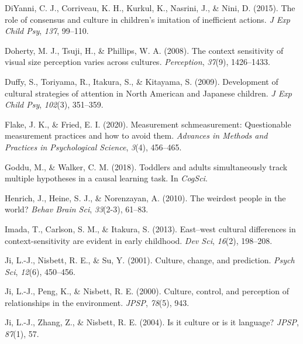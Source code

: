 \documentclass[
  man]{apa6}
\newlength{\cslhangindent}
\newlength{\cslentryspacingunit} %
\newenvironment{CSLReferences}[2] %
 {%
  \setlength{\parindent}{0pt}
  \ifodd #1
  \let\oldpar\par
  \def\par{\hangindent=\cslhangindent\oldpar}
  \fi
  \setlength{\parskip}{#2\cslentryspacingunit}
 }%
 {}
\begin{document}
\begin{CSLReferences}{1}{0}
\leavevmode{}%
DiYanni, C. J., Corriveau, K. H., Kurkul, K., Nasrini, J., \& Nini, D. (2015). The role of consensus and culture in children's imitation of inefficient actions. \emph{J Exp Child Psy}, \emph{137}, 99--110.

\leavevmode{}%
Doherty, M. J., Tsuji, H., \& Phillips, W. A. (2008). The context sensitivity of visual size perception varies across cultures. \emph{Perception}, \emph{37}(9), 1426--1433.

\leavevmode{}%
Duffy, S., Toriyama, R., Itakura, S., \& Kitayama, S. (2009). Development of cultural strategies of attention in {N}orth {A}merican and {J}apanese children. \emph{J Exp Child Psy}, \emph{102}(3), 351--359.

\leavevmode{}%
Flake, J. K., \& Fried, E. I. (2020). Measurement schmeasurement: Questionable measurement practices and how to avoid them. \emph{Advances in Methods and Practices in Psychological Science}, \emph{3}(4), 456--465.

\leavevmode{}%
Goddu, M., \& Walker, C. M. (2018). Toddlers and adults simultaneously track multiple hypotheses in a causal learning task. In \emph{CogSci}.

\leavevmode{}%
Henrich, J., Heine, S. J., \& Norenzayan, A. (2010). The weirdest people in the world? \emph{Behav Brain Sci}, \emph{33}(2-3), 61--83.

\leavevmode{}%
Imada, T., Carlson, S. M., \& Itakura, S. (2013). East--west cultural differences in context-sensitivity are evident in early childhood. \emph{Dev Sci}, \emph{16}(2), 198--208.

\leavevmode{}%
Ji, L.-J., Nisbett, R. E., \& Su, Y. (2001). Culture, change, and prediction. \emph{Psych Sci}, \emph{12}(6), 450--456.

\leavevmode{}%
Ji, L.-J., Peng, K., \& Nisbett, R. E. (2000). Culture, control, and perception of relationships in the environment. \emph{JPSP}, \emph{78}(5), 943.

\leavevmode{}%
Ji, L.-J., Zhang, Z., \& Nisbett, R. E. (2004). Is it culture or is it language? \emph{JPSP}, \emph{87}(1), 57.


\end{CSLReferences}
\end{document}
